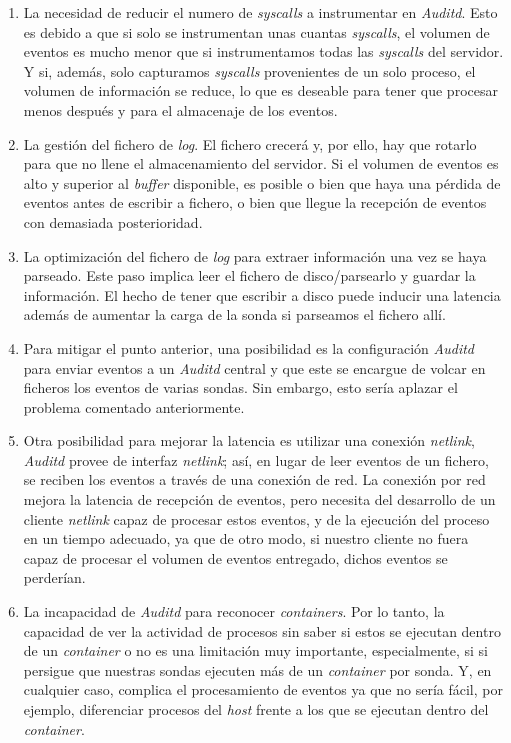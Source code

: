 \begin{enumerate}
    \item La necesidad de reducir el numero de \emph{syscalls} a instrumentar en \emph{Auditd}. Esto es debido a que si solo se instrumentan unas cuantas \emph{syscalls}, el volumen de eventos es mucho menor que si
    instrumentamos todas las \emph{syscalls} del servidor. Y si, además, solo capturamos \emph{syscalls} provenientes de un solo proceso, el volumen de información se reduce, lo que es 
    deseable para tener que procesar menos después y para el almacenaje de los eventos.
    \item La gestión del fichero de \emph{log}. El fichero crecerá y, por ello, hay que rotarlo para que no llene el almacenamiento del servidor. Si el volumen de eventos es alto y superior 
    al \emph{buffer} disponible, es posible o bien que haya una pérdida de eventos antes de escribir a fichero, o bien que llegue la recepción de eventos con demasiada posterioridad.
    \item La optimización del fichero de \emph{log} para extraer información una vez se haya parseado. Este paso implica leer el fichero de disco/parsearlo y guardar la información. El hecho de tener que escribir a disco puede inducir una latencia además de aumentar la carga de la sonda si parseamos el fichero allí.
    \item Para mitigar el punto anterior, una posibilidad es la configuración  \emph{Auditd} para enviar eventos a un \emph{Auditd} central y que este se encargue de volcar en ficheros los eventos de varias sondas. Sin embargo, esto sería aplazar el problema
    comentado anteriormente.
    \item Otra posibilidad para mejorar la latencia es utilizar una conexión \emph{netlink},
    \emph{Auditd} provee de interfaz \emph{netlink}; así, en lugar de leer eventos de un fichero, 
    se reciben los eventos a través de una conexión de red. 
    La conexión por red mejora la latencia de recepción de eventos, 
    pero necesita del desarrollo de un cliente \emph{netlink} capaz de procesar estos eventos, 
    y de la ejecución del proceso en un tiempo adecuado, ya que de otro modo, 
    si nuestro cliente no fuera capaz de procesar el volumen de eventos entregado,
    dichos eventos se perderían.
    \item La incapacidad de \emph{Auditd} para reconocer \emph{containers}. Por lo tanto, la capacidad de ver la actividad de procesos
    sin saber si estos se ejecutan dentro de un \emph{container} o no es una limitación muy importante, especialmente, si si persigue que nuestras sondas
    ejecuten más de un \emph{container} por sonda. Y, en cualquier caso, complica el procesamiento de eventos ya que no sería fácil, por ejemplo, diferenciar procesos
    del \emph{host} frente a los que se ejecutan dentro del \emph{container}.
\end{enumerate}

